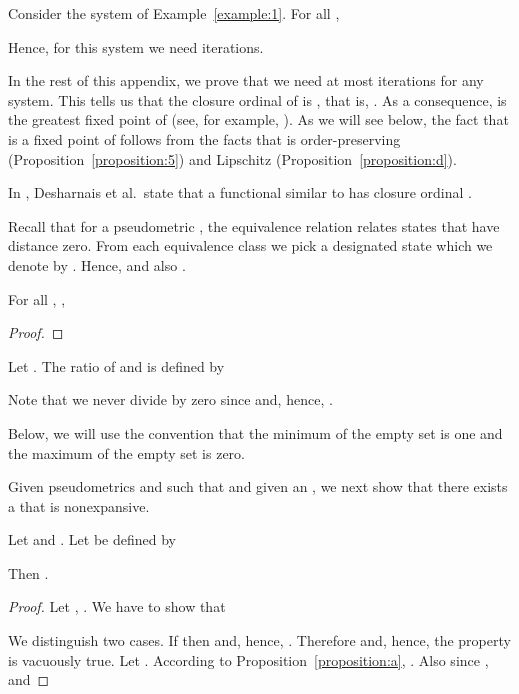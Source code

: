 \documentclass{LMCS}
\begin{document}
\begin{exa}
Consider the system of Example~\ref{example:1}.  For all ,

Hence, for this system we need  iterations.
\end{exa}

In the rest of this appendix, we prove that we need at most
 iterations for any system.  This tells us that the 
closure ordinal of  is
, that is, .
As a consequence,  is the greatest fixed point of
 (see, for example, \cite[Example~4.13]{DP90}).  As we will 
see below, the fact that  is a fixed point of  follows
from the facts that  is order-preserving 
(Proposition~\ref{proposition:5}) and Lipschitz 
(Proposition~\ref{proposition:d}).

In \cite[page~418]{DGJP02:lics}, Desharnais et al.\ state that
a functional similar to  has closure ordinal .

Recall that for a pseudometric , the equivalence relation  
relates states that have distance zero.  From each equivalence class 
 we pick a designated state which we denote by .  
Hence,  and also .

\begin{prop}
\label{proposition:a}
For all , ,

\end{prop}
\begin{proof}

\end{proof}

Let .  The ratio 
of  and  is defined by

Note that we never divide by zero since 
and, hence, .  

Below, we will use the convention that the minimum of 
the empty set is one and the maximum of the empty set is zero.

Given pseudometrics  and  such that  and
given an , we next show that there
exists a  that is nonexpansive.

\begin{prop}
\label{proposition:b}
Let  and .
Let  be defined by

Then .
\end{prop}
\begin{proof}
Let , .  We have to show that

We distinguish two cases.  If  then
 and, hence, .
Therefore  and, hence, the property is vacuously
true.  Let .  According to 
Proposition~\ref{proposition:a}, .
Also  since , and

\end{proof}
\end{document}
